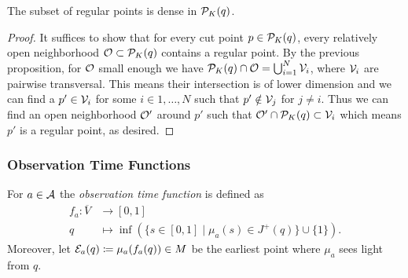 \begin{corollary}The subset of regular points is dense in $\mathcal{P}_K(q)$.
\end{corollary}
\begin{proof}
It suffices to show that for every cut point $p\in \mathcal{P}_K(q)$, every relatively open neighborhood $\mathcal{O}\subset\mathcal{P}_K(q)$ contains a regular point. By the previous proposition, for $\mathcal{O}$ small enough we have $\mathcal{P}_K(q)\cap \mathcal{O} = \bigcup_{i=1}^N\mathcal{V}_i$, where $\mathcal{V}_i$ are pairwise transversal. This means their intersection is of lower dimension and we can find a $p'\in \mathcal{V}_i$ for some $i\in 1,\dots,N$ such that $p'\notin \mathcal{V}_j$ for $j\neq i$. Thus we can find an open neighborhood $\mathcal{O}'$ around $p'$ such that $\mathcal{O}'\cap \mathcal{P}_K(q)\subset \mathcal{V}_i$ which means $p'$ is a regular point, as desired.
\end{proof}

\subsubsection{Observation Time Functions}
\begin{definition}\label{def:observationtime}
For $a\in \mathcal{A}$ the \emph{observation time function} 
is defined as 
\begin{align*}
    f_a:\overline{V}&\to [0,1]\\
    q&\mapsto\inf(\{s\in [0,1] \mid \mu_a(s)\in J^+(q)\}\cup \{1\}).
\end{align*}
Moreover, let $\mathcal{E}_a(q)\coloneqq\mu_a(f_a(q))\in M$ be the earliest point where $\mu_a$ sees light from $q$.
\end{definition}

